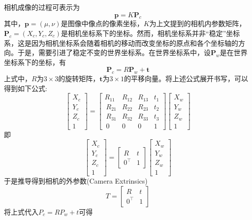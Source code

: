 相机成像的过程可表示为
\begin{equation}
  \bm{p} = K\bm{P}_{c}
\end{equation}
其中，$\bm{p}=(\mu, \nu)$是图像中像点的像素坐标，$K$为上文提到的相机内参数矩阵，$\bm{P}_{c}=(X_{c}, Y_{c}, Z_{c})$是相机坐标系下的坐标。然而，相机坐标系并非“稳定”坐标系，这是因为相机坐标系会随着相机的移动而改变坐标的原点和各个坐标轴的方向。于是，需要引进了稳定不变的世界坐标系。在世界坐标系中，设$\bm{P}_{w}$是在世界坐标系下的坐标，有
\begin{equation}
  \bm{P}_{c} = R\bm{P}_{w} + \bm{t}
\end{equation}
上式中，$R$为$3 \times 3$的旋转矩阵，$\bm{t}$为$3 \times 1$的平移向量。将上述公式展开书写，可以得到如下公式:
\begin{equation}
  \left[
    \begin{array}{c}X_c\\Y_c\\Z_c\\1\end{array}
  \right] 
  = 
  \left[
    \begin{matrix}
      R_{11} & R_{12} & R_{13} & t_1 \\\
      R_{21} & R_{22} & R_{23} & t_2 \\\
      R_{31} & R_{32} & R_{33} & t_3 \\\
      0 & 0 & 0 & 1
    \end{matrix}
  \right]
  \left[
    \begin{array}{c}X_w\\Y_w\\Z_w\\1\end{array}
  \right]
\end{equation}
即
\begin{equation}
\left[
  \begin{array}{c}X_c\\Y_c\\Z_c\\1\end{array}
\right] = 
\left[
  \begin{matrix}R&t\\0^\top&1\end{matrix}
\right]
\left[
  \begin{array}{c}X_w\\Y_w\\Z_w\\1\end{array}
\right]
\end{equation}
于是推导得到相机的外参数(Camera Extrinsics)
\begin{equation}
T = \left[\begin{matrix}R&t\\0^\top&1\end{matrix}\right]
\end{equation}
将上式代入$ P_{c} = RP_{w} + t $可得

